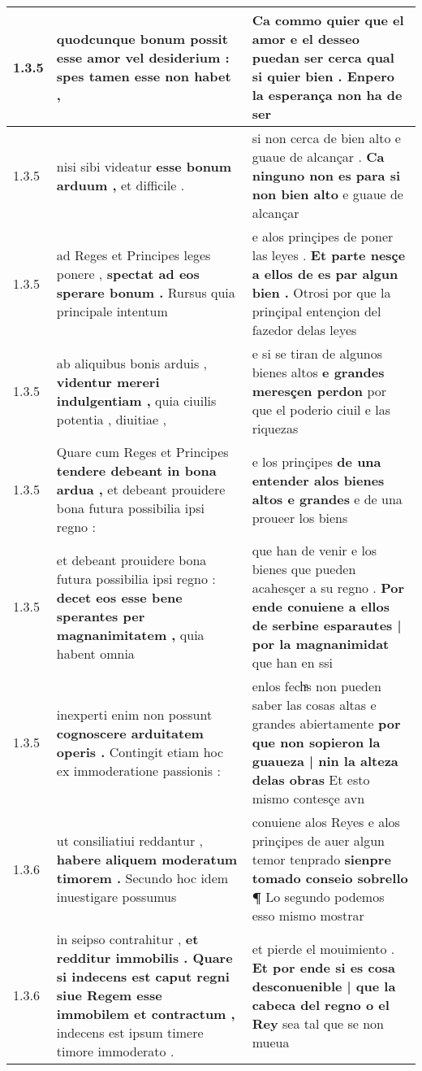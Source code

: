 \begin{tabular}{|p{1cm}|p{6.5cm}|p{6.5cm}|}
1.3.5 & quodcunque bonum possit \textbf{ esse amor vel desiderium : } spes tamen esse non habet , & Ca commo quier que el amor e el desseo puedan ser cerca \textbf{ qual si quier bien . } Enpero la esperança non ha de ser \\\hline
1.3.5 & nisi sibi videatur \textbf{ esse bonum arduum , } et difficile . & si non cerca de bien alto e guaue de alcançar . \textbf{ Ca ninguno non es para si non bien alto } e guaue de alcançar \\\hline
1.3.5 & ad Reges et Principes leges ponere , \textbf{ spectat ad eos sperare bonum . } Rursus quia principale intentum & e alos prinçipes de poner las leyes . \textbf{ Et parte nesçe a ellos de es par algun bien . } Otrosi por que la prinçipal entençion del fazedor delas leyes \\\hline
1.3.5 & ab aliquibus bonis arduis , \textbf{ videntur mereri indulgentiam , } quia ciuilis potentia , diuitiae , & e si se tiran de algunos bienes altos \textbf{ e grandes meresçen perdon } por que el poderio ciuil e las riquezas \\\hline
1.3.5 & Quare cum Reges et Principes \textbf{ tendere debeant in bona ardua , } et debeant prouidere bona futura possibilia ipsi regno : & e los prinçipes \textbf{ de una entender alos bienes altos e grandes } e de una proueer los biens \\\hline
1.3.5 & et debeant prouidere bona futura possibilia ipsi regno : \textbf{ decet eos esse bene sperantes per magnanimitatem , } quia habent omnia & que han de venir e los bienes que pueden acahesçer a su regno . \textbf{ Por ende conuiene a ellos de serbine esparautes | por la magnanimidat } que han en ssi \\\hline
1.3.5 & inexperti enim non possunt \textbf{ cognoscere arduitatem operis . } Contingit etiam hoc ex immoderatione passionis : & enlos fechͣs non pueden saber las cosas altas e grandes abiertamente \textbf{ por que non sopieron la guaueza | nin la alteza delas obras } Et esto mismo contesçe avn \\\hline
1.3.6 & ut consiliatiui reddantur , \textbf{ habere aliquem moderatum timorem . } Secundo hoc idem inuestigare possumus & conuiene alos Reyes e alos prinçipes de auer algun temor tenprado \textbf{ sienpre tomado conseio sobrello ¶ } Lo segundo podemos esso mismo mostrar \\\hline
1.3.6 & in seipso contrahitur , \textbf{ et redditur immobilis . Quare si indecens est caput regni siue Regem esse immobilem et contractum , } indecens est ipsum timere timore immoderato . & et pierde el mouimiento . \textbf{ Et por ende si es cosa desconuenible | que la cabeca del regno o el Rey } sea tal que se non mueua \\\hline

\end{tabular}
